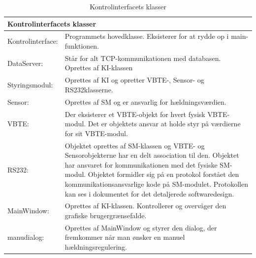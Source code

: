 \begin{table}[H]
\centering
{}
\begin{tabular}{| p{3cm}  p{12.5cm}|}
\multicolumn{2}{l}{{\Large Kontrolinterfacets klasser}} \\\hline
Kontrolinterface:&Programmets hovedklasse. Eksisterer for at rydde op i main-funktionen.\\\hline
DataServer:&Står for alt TCP-kommunikationen med databasen. Oprettes af KI-klassen\\\hline
Styringsmodul:&Oprettes af KI og opretter VBTE-, Sensor- og RS232klasserne.\\\hline
Sensor:&Oprettes af SM og er ansvarlig for hældningsværdien.\\\hline
VBTE:&Der eksisterer et VBTE-objekt for hvert fysisk VBTE-modul. Det er objektets ansvar at holde styr på værdierne for sit VBTE-modul.\\\hline
RS232:&Objektet oprettes af SM-klassen og VBTE- og Sensorobjekterne har en delt association til den. Objektet har ansvaret for kommunikationen med det fysiske SM-modul. Objektet formidler sig på en protokol forstået den kommunikationsansvarlige kode på SM-modulet. Protokollen kan ses i dokumentet for det detaljerede softwaredesign.\\\hline
MainWindow:&Oprettes af KI-klassen. Kontrollerer og overvåger den grafiske brugergrænsefalde.\\\hline
manudialog:&Oprettes af MainWindow og styrer den dialog, der fremkommer når man ønsker en manuel hældningsregulering.\\\hline
\end{tabular}
\caption{Kontrolinterfacets klasser}
\label{tabel:ki-klasser}
\end{table}

